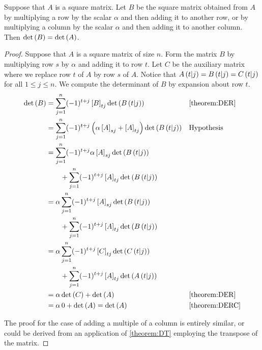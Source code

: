 \documentclass{ximera}
\begin{document}
\begin{theorem}
  \label{theorem:DRCMA}

  Suppose that $A$ is a square matrix.  Let $B$ be the square matrix
  obtained from $A$ by multiplying a row by the scalar $\alpha$ and
  then adding it to another row, or by multiplying a column by the
  scalar $\alpha$ and then adding it to another column.  Then
  $\det\left(B\right)=\det\left(A\right)$.

  \begin{proof}
    Suppose that $A$ is a square matrix of size $n$.  Form the matrix
    $B$ by multiplying row $s$ by $\alpha$ and adding it to row $t$.
    Let $C$ be the auxiliary matrix where we replace row $t$ of $A$ by
    row $s$ of $A$.  Notice that
    $A\left(t|j\right)=B\left(t|j\right)=C\left(t|j\right)$ for
    all $1\leq j\leq n$.  We compute the determinant of $B$ by
    expansion about row $t$.
    \begin{align*}
      \det\left(B\right)
      &=
        \sum_{j=1}^{n}(-1)^{t+j}\left\lbrack B\right\rbrack_{tj}\det\left(B\left(t|j\right)\right)
      &&\ref{theorem:DER}\\
      &=
        \sum_{j=1}^{n}(-1)^{t+j}\left(\alpha\left\lbrack A\right\rbrack_{sj}+\left\lbrack A\right\rbrack_{tj}\right)\det\left(B\left(t|j\right)\right)
      &&\text{Hypothesis}\\
      &=
        \sum_{j=1}^{n}(-1)^{t+j}\alpha\left\lbrack A\right\rbrack_{sj}\det\left(B\left(t|j\right)\right)\\
      &\quad\quad+
        \sum_{j=1}^{n}(-1)^{t+j}\left\lbrack A\right\rbrack_{tj}\det\left(B\left(t|j\right)\right)\\
      &=
        \alpha\sum_{j=1}^{n}(-1)^{t+j}\left\lbrack A\right\rbrack_{sj}\det\left(B\left(t|j\right)\right)\\
      &\quad\quad+
        \sum_{j=1}^{n}(-1)^{t+j}\left\lbrack A\right\rbrack_{tj}\det\left(B\left(t|j\right)\right)\\
      &=
        \alpha\sum_{j=1}^{n}(-1)^{t+j}\left\lbrack C\right\rbrack_{tj}\det\left(C\left(t|j\right)\right)\\
      &\quad\quad+
        \sum_{j=1}^{n}(-1)^{t+j}\left\lbrack A\right\rbrack_{tj}\det\left(A\left(t|j\right)\right)\\
      &=
        \alpha\det\left(C\right)+\det\left(A\right)&&\ref{theorem:DER}\\
      &=
        \alpha\,0+\det\left(A\right) = \det\left(A\right)&&\ref{theorem:DERC}
    \end{align*}

    The proof for the case of adding a multiple of a column is
    entirely similar, or could be derived from an application of
    \ref{theorem:DT} employing the transpose of the matrix.
  \end{proof}
\end{theorem}
\end{document}
